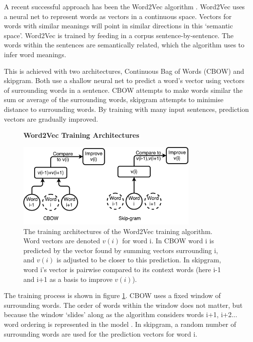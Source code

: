  A recent successful approach has been the Word2Vec algorithm \cite{word2vec1}\cite{word2vec2}.  Word2Vec uses a neural net to represent words as vectors in a continuous space. Vectors for words with similar meanings will point in similar directions in this `semantic space'. Word2Vec is trained by feeding in a corpus sentence-by-sentence. The words within the sentences are semantically related, which the algorithm uses to infer word meanings. 
 
This is achieved with two architectures, Continuous Bag of Words (CBOW) and skipgram. Both use a shallow neural net to predict a word's vector using vectors of surrounding words in a sentence. CBOW attempts to make words similar the sum or average of the surrounding words, skipgram attempts to minimise distance to surrounding words. By training with many input sentences, prediction vectors are gradually improved.

\begin{figure}[H]
    \centering
    \textbf{Word2Vec Training Architectures}\par\medskip
    \includegraphics[width=0.8\textwidth]{Natural_Language_Processing/cbow_v_skip.pdf}
    \caption[Word2Vec Training Architectures ]{The training architectures of the Word2Vec training algorithm. Word vectors are denoted $v(i)$ for word i. In CBOW word i is predicted by the vector found by summing vectors surrounding i, and $v(i)$ is adjusted to be closer to this prediction. In skipgram, word i's vector is pairwise compared to its context words (here i-1 and i+1 as a basis to improve $v(i)$).}
     \label{fig:CBOWSKIP}
\end{figure}

The training process is shown in figure \ref{fig:CBOWSKIP}. CBOW uses a fixed window of surrounding words. The order of words within the window does not matter, but because the window `slides' along as the algorithm considers words i+1, i+2... word ordering is represented in the model . In skipgram, a random number of surrounding words are used for the prediction vectors for word i. 

